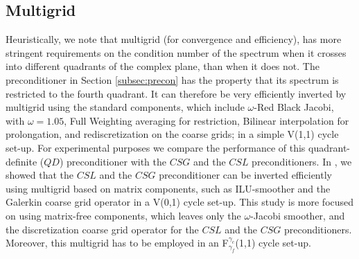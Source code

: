 \documentclass[mathpazo]{cicp}
\theoremstyle{definition}
\numberwithin{equation}{section}
\begin{document}
\subsection{Multigrid}
\label{subsec:mg}
Heuristically, we note that multigrid (for convergence and efficiency), has more stringent requirements on 
the condition number of the spectrum when it crosses into different quadrants of the complex plane, than when 
it does not. The preconditioner in Section \ref{subsec:precon} has the property that its spectrum is 
restricted to the fourth quadrant. It can therefore be very efficiently inverted by multigrid using the standard 
components, which include $\omega$-Red Black Jacobi, with $\omega = 1.05$, Full Weighting averaging for restriction, 
Bilinear interpolation for prolongation, and rediscretization on the coarse grids; in a simple V(1,1) cycle set-up.
 For experimental purposes we compare the performance of this quadrant-definite ($QD$) preconditioner with the $CSG$ and 
the $CSL$ preconditioners.
 In \cite{reps2009}, we showed that the $CSL$ and the $CSG$ preconditioner can be inverted efficiently using multigrid based on matrix components, such as ILU-smoother and the Galerkin coarse grid operator in a V(0,1) cycle set-up. This study is more focused on using matrix-free components, which leaves only the $\omega$-Jacobi smoother, and the discretization coarse grid operator for the $CSL$ and the $CSG$ preconditioners. Moreover, this multigrid has to be employed in an F$_{\gamma_f}^{\gamma_c}$(1,1) cycle set-up. 
\end{document}
